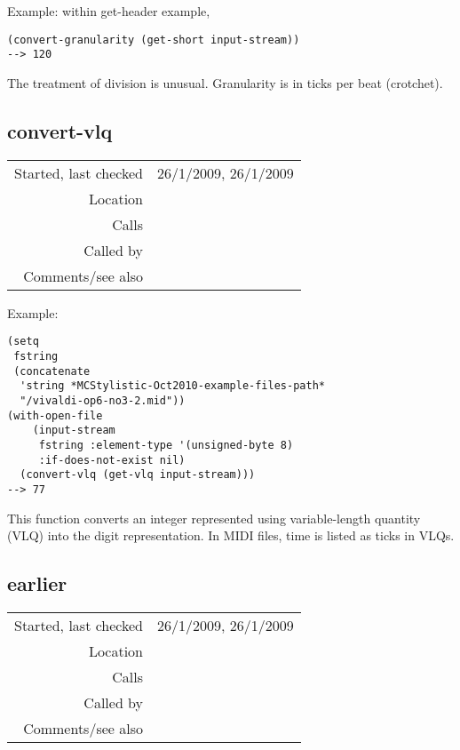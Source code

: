 \vspace{0.5cm}
\noindent Example: within get-header example,
\begin{verbatim}
(convert-granularity (get-short input-stream))
--> 120
\end{verbatim}

\noindent The treatment of division is unusual.
Granularity is in ticks per beat (crotchet).


\subsection*{convert-vlq}\label{fun:convert-vlq}

\vspace{0.3cm}
\begin{tabular}{r|p{8cm}}
Started, last checked & 26/1/2009, 26/1/2009 \\
Location & \nameref{sec:MIDI-import} \\
Calls & \\
Called by & \nameref{fun:set-track-time} \\
Comments/see also & \nameref{fun:get-vlq}
\end{tabular}

\vspace{0.5cm}
\noindent Example:
\begin{verbatim}
(setq
 fstring
 (concatenate
  'string *MCStylistic-Oct2010-example-files-path*
  "/vivaldi-op6-no3-2.mid"))
(with-open-file
    (input-stream
     fstring :element-type '(unsigned-byte 8)
     :if-does-not-exist nil)
  (convert-vlq (get-vlq input-stream)))
--> 77
\end{verbatim}

\noindent This function converts an integer
represented using variable-length quantity (VLQ) into
the digit representation. In MIDI files, time is
listed as ticks in VLQs.


\subsection*{earlier}\label{fun:earlier}

\vspace{0.3cm}
\begin{tabular}{r|p{8cm}}
Started, last checked & 26/1/2009, 26/1/2009 \\
Location & \nameref{sec:MIDI-import} \\
Calls & \\
Called by & \nameref{fun:load-midi-file} \\
Comments/see also &
\end{tabular}

